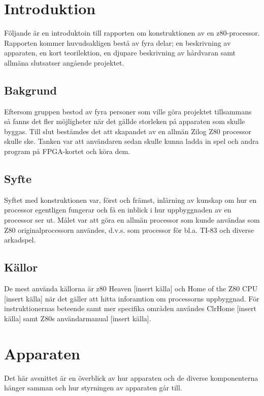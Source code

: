 \documentclass{article}
\begin{document}
\maketitle

\tableofcontents

\clearpage
\section{Introduktion}
Följande är en introduktoin till rapporten om konstruktionen av en z80-processor. Rapporten kommer huvudsakligen bestå av fyra delar; en beskrivning av apparaten, en kort teorilektion, en djupare beskrivning av hårdvaran samt allmäna slutsatser angående projektet.
\subsection{Bakgrund}
Eftersom gruppen bestod av fyra personer som ville göra projektet tillsammans så fanns det fler möjligheter när det gällde storleken på apparaten som skulle byggas. Till slut bestämdes det att skapandet av en allmän Zilog Z80 processor skulle ske. Tanken var att användaren sedan skulle kunna ladda in spel och andra program på FPGA-kortet och köra dem.
\subsection{Syfte}
Syftet med konstruktionen var, först och främst, inlärning av kunskap om hur en processor egentligen fungerar och få en inblick i hur uppbyggnaden av en processor ser ut. Målet var att göra en allmän processor som kunde användas som Z80 originalprocessorn användes, d.v.s. som processor för bl.a. TI-83 och diverse arkadspel.
\subsection{Källor}
De mest använda källorna är z80 Heaven [insert källa] och Home of the Z80 CPU [insert källa] när det gäller att hitta inforamtion om processorns uppbyggnad. För instruktionernas beteende samt mer specifika områden användes ClrHome [insert källa] samt Z80s användarmanual [insert källa].

\clearpage
\section{Apparaten}
Det här avsnittet är en överblick av hur apparaten och de diverse komponenterna hänger samman och hur styrningen av apparaten går till.
\end{document}
